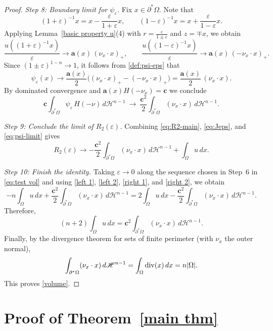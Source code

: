 \documentclass[reqno,11pt]{amsart}
\numberwithin{equation}{section}
\theoremstyle{remark}
\begin{document}
\begin{proof}
\medskip
\noindent\textit{Step 8: Boundary limit for $\psi_\varepsilon$.}
Fix $x\in\partial^*\Omega$. Note that
\[
(1+\varepsilon)^{-1}x = x-\frac{\varepsilon}{1+\varepsilon}x,\qquad
(1-\varepsilon)^{-1}x = x+\frac{\varepsilon}{1-\varepsilon}x.
\]
Applying Lemma~\ref{basic property u}(4) with $r=\frac{\varepsilon}{1\pm\varepsilon}$ and $z=\mp x$, we obtain
\[
\frac{u((1+\varepsilon)^{-1}x)}{\varepsilon}\to \mathbf a(x)\,(\nu_x\cdot x)_+,
\qquad
\frac{u((1-\varepsilon)^{-1}x)}{\varepsilon}\to \mathbf a(x)\,(-\nu_x\cdot x)_+.
\]
Since {$(1\pm\varepsilon)^{1-n}\to 1$}, it follows from \eqref{def:psi-eps} that
\[
\psi_\varepsilon(x)\to
\frac{\mathbf a(x)}{2}\Big((\nu_x\cdot x)_+-(-\nu_x\cdot x)_+\Big)
=\frac{\mathbf a(x)}{2}\,(\nu_x\cdot x).
\]
By dominated convergence and $\mathbf a(x)H(-\nu_x)=\mathbf c$ we conclude
\begin{equation}\label{eq:psi-limit}
\mathbf c\int_{\partial^*\Omega}\psi_\varepsilon\,H(-\nu)\,d\mathscr H^{n-1}
\ \longrightarrow\
\frac{\mathbf c^2}{2}\int_{\partial^*\Omega}(\nu_x\cdot x)\,d\mathscr H^{n-1}.
\end{equation}

\medskip
\noindent\textit{Step 9: Conclude the limit of $R_2(\varepsilon)$.}
Combining \eqref{eq:R2-main}, \eqref{eq:Jeps}, and \eqref{eq:psi-limit} gives
\begin{equation}\label{right 2}
R_2(\varepsilon)\to
-\frac{\mathbf c^2}{2}\int_{\partial^*\Omega}(\nu_x\cdot x)\,d\mathscr H^{n-1}
+\int_\Omega u\,dx.
\end{equation}

\medskip
\noindent\textit{Step 10: Finish the identity.}
{Taking $\varepsilon\to 0$ along the sequence chosen in Step~6} in \eqref{eq:test vol} and using \eqref{left 1}, \eqref{left 2}, \eqref{right 1}, and \eqref{right 2},
we obtain
\[
-n\int_{\Omega} u\, dx+\frac{\mathbf{c}^2}{2} \int_{\partial^*\Omega} (\nu_x\cdot x) \, d\mathscr H^{n-1}
=
2\int_{\Omega} u\, dx-\frac{\mathbf {c}^2}{2} \int_{\partial^*\Omega} (\nu_x\cdot x) \, d\mathscr H^{n-1}.
\]
Therefore,
\[
(n+2)\int_\Omega u\,dx=\mathbf c^2\int_{\partial^*\Omega}(\nu_x\cdot x)\,d\mathscr H^{n-1}.
\]
Finally, by the divergence theorem for sets of finite perimeter (with $\nu_x$ the outer normal),
\[
\int_{\partial^*\Omega}(\nu_x\cdot x)\,d\mathscr H^{n-1}=\int_\Omega {\rm div}(x)\,dx=n|\Omega|.
\]
This proves \eqref{volume}.
\end{proof}


\section{Proof of Theorem~\ref{main thm}}
\label{sec:proof}
\end{document}
